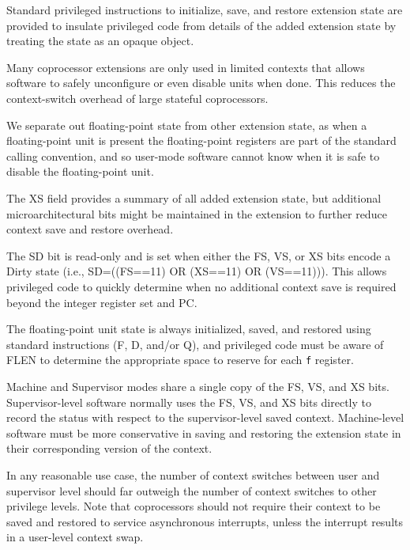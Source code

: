 Standard privileged instructions to initialize, save, and restore
extension state are provided to insulate privileged code from details
of the added extension state by treating the state as an opaque
object.

\begin{commentary}
Many coprocessor extensions are only used in limited contexts that
allows software to safely unconfigure or even disable units when done.
This reduces the context-switch overhead of large stateful
coprocessors.

We separate out floating-point state from other extension state, as
when a floating-point unit is present the floating-point registers are
part of the standard calling convention, and so user-mode software
cannot know when it is safe to disable the floating-point unit.
\end{commentary}

The XS field provides a summary of all added extension state, but
additional microarchitectural bits might be maintained in the
extension to further reduce context save and restore overhead.

The SD bit is read-only and is set when either the FS, VS, or XS bits
encode a Dirty state (i.e., SD=((FS==11) OR (XS==11) OR (VS==11))).  This allows
privileged code to quickly determine when no additional context save is
required beyond the integer register set and PC.

The floating-point unit state is always initialized, saved, and
restored using standard instructions (F, D, and/or Q), and privileged
code must be aware of FLEN to determine the appropriate space to
reserve for each {\tt f} register.

Machine and Supervisor modes share a single copy of the FS, VS, and XS bits.
Supervisor-level software
normally uses the FS, VS, and XS bits directly to record the status with
respect to the supervisor-level saved context.
Machine-level software must be more conservative in saving and restoring the
extension state in their corresponding version of the context.

\begin{commentary}
In any reasonable use case, the number of context switches between
user and supervisor level should far outweigh the number of context
switches to other privilege levels.  Note that coprocessors should not
require their context to be saved and restored to service asynchronous
interrupts, unless the interrupt results in a user-level context swap.
\end{commentary}

